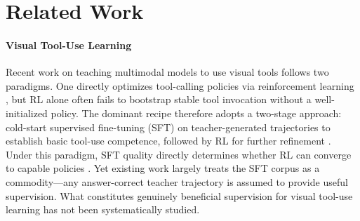 \section{Related Work}
\label{sec:related_work}


\paragraph{Visual Tool-Use Learning}
Recent work on teaching multimodal models to use visual tools follows two paradigms. One directly optimizes tool-calling policies via reinforcement learning \citep{zheng2026deepeyes, wu2026vtoolr}, but RL alone often fails to bootstrap stable tool invocation without a well-initialized policy. The dominant recipe therefore adopts a two-stage approach: cold-start supervised fine-tuning (SFT) on teacher-generated trajectories to establish basic tool-use competence, followed by RL for further refinement \citep{su2025openthinkimg, su2026pixelreasoner, hong2026deepeyesv2, lai2026minio3, guo2025codevision, hou2025codev}. Under this paradigm, SFT quality directly determines whether RL can converge to capable policies \citep{hong2026deepeyesv2, zhang2026thyme}. Yet existing work largely treats the SFT corpus as a commodity—any answer-correct teacher trajectory is assumed to provide useful supervision. What constitutes genuinely beneficial supervision for visual tool-use learning has not been systematically studied.

